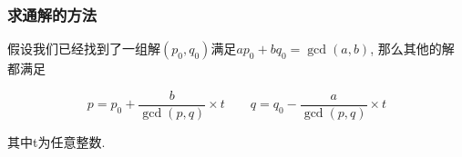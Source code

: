 \subsubsection{求通解的方法}

假设我们已经找到了一组解$(p_0, q_0)$满足$a p_0 + b q_0 = \gcd(a,b)$, 那么其他的解都满足

$$p = p_0 + \frac b {\gcd(p, q)} \times t\quad\quad q = q_0 - \frac a {\gcd(p, q)} \times t$$

其中t为任意整数.